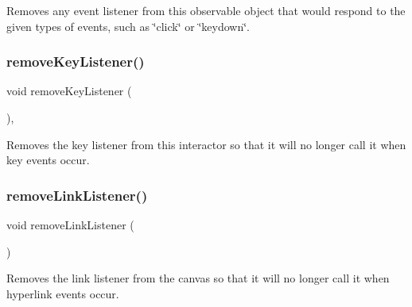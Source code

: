 Removes any event listener from this observable object that would respond to the given types of events, such as \char`\"{}click\char`\"{} or \char`\"{}keydown\char`\"{}. 

\mbox{\label{classGInteractor_a43095f41cab3be732b49f29970484b05}} 
\subsubsection{\texorpdfstring{remove\+Key\+Listener()}{removeKeyListener()}}
{\footnotesize\ttfamily void remove\+Key\+Listener (\begin{DoxyParamCaption}{ }\end{DoxyParamCaption})\hspace{0.3cm}{\ttfamily [virtual]}, {\ttfamily [inherited]}}



Removes the key listener from this interactor so that it will no longer call it when key events occur. 

\mbox{\label{classGBrowserPane_a263a2282597ca9f0f73301fb202ae390}} 
\subsubsection{\texorpdfstring{remove\+Link\+Listener()}{removeLinkListener()}}
{\footnotesize\ttfamily void remove\+Link\+Listener (\begin{DoxyParamCaption}{ }\end{DoxyParamCaption})\hspace{0.3cm}{\ttfamily [virtual]}}



Removes the link listener from the canvas so that it will no longer call it when hyperlink events occur. 

\mbox{\label{classGInteractor_aff47f71ce47e688a07c9d38dc92fcc11}} 

